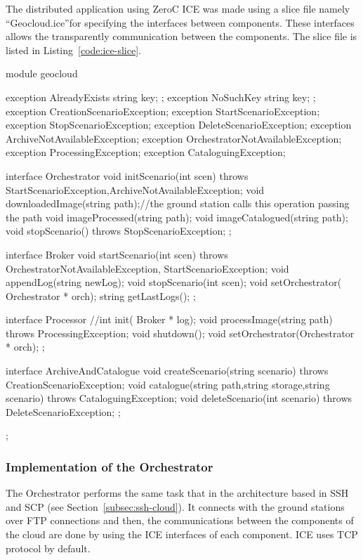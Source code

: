 The distributed application using ZeroC ICE was made using a slice file namely
``Geocloud.ice''for
specifying the  interfaces between components. These interfaces allows the transparently
communication between the components. The slice file is listed in Listing~\ref{code:ice-slice}.


\begin{listing}[
  float=h!,
  caption  = {Slice of the ICE application},
  label    = code:ice-slice,
style=customc]

module geocloud {
    exception AlreadyExists { string key; };
    exception NoSuchKey { string key; };
    exception CreationScenarioException{};
    exception StartScenarioException{};
    exception StopScenarioException{};
    exception DeleteScenarioException{};
    exception ArchiveNotAvailableException{};
    exception OrchestratorNotAvailableException{};
    exception ProcessingException{};
    exception CataloguingException{};

    interface Orchestrator{
    	void initScenario(int scen) throws StartScenarioException,ArchiveNotAvailableException;
	void downloadedImage(string path);//the ground station calls this operation passing the path
	void imageProcessed(string path);
	void imageCatalogued(string path);
	void stopScenario() throws StopScenarioException;
    };

    interface Broker{
	void startScenario(int scen) throws OrchestratorNotAvailableException, StartScenarioException;
	void appendLog(string newLog);
	void stopScenario(int scen);
	void setOrchestrator( Orchestrator * orch);
	string getLastLogs();
    };


 interface Processor{
	//int init( Broker * log);
       	void processImage(string path) throws ProcessingException;
	void shutdown();
	void setOrchestrator(Orchestrator * orch);
    };



    interface ArchiveAndCatalogue{
	void createScenario(string scenario) throws CreationScenarioException;
	void catalogue(string path,string storage,string scenario) throws CataloguingException;
	void deleteScenario(int scenario) throws DeleteScenarioException;
    };
};
\end{listing}

\subsubsection{Implementation of the Orchestrator}

The Orchestrator performs the same task that in the architecture based in
\ac{SSH} and \ac{SCP} (see Section~\ref{subsec:ssh-cloud}). It connects with the ground stations over \ac{FTP} connections and
then, the communications between the components of the cloud are done by using the
ICE interfaces of each component. ICE uses \ac{TCP} protocol by default.

